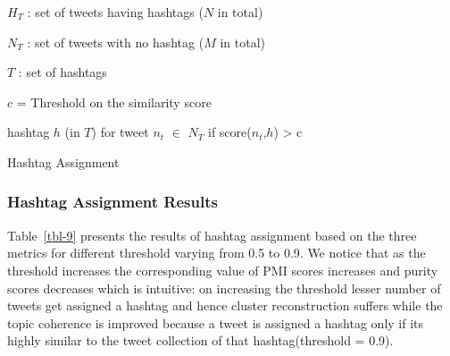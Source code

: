 \documentclass[10pt,a5paper,twoside]{article}
\newcommand{\var}{v}
\begin{document}

\incmargin{1.5em}
\linesnumbered
\begin{algorithm}[hb!]
\dontprintsemicolon

\Input
{
$H_T$ : set of tweets having hashtags ($N$ in total)
 
$N_T$ : set of tweets with no hashtag ($M$ in total)
 
$T$ : set of hashtags
 
$c$ = \footnotesize{Threshold} on the similarity score
}
\Output
{
hashtag $h$ (in $T$) for tweet $n_t$ $\in$ $N_T$ if score($n_t$,$h$) > c
}
\BlankLine
{\small
{}
}
\caption{{\sc Hashtag Assignment} \label{alg-1}}
\end{algorithm}
\decmargin{1.5em}


\subsubsection{Hashtag Assignment Results}

Table~\ref{tbl-9} presents the results of hashtag assignment based on
the three metrics for different threshold varying from 0.5 to 0.9. We
notice that as the threshold increases the corresponding value of PMI
scores increases and purity scores decreases which is intuitive: on
increasing the threshold lesser number of tweets get assigned a
hashtag and hence cluster reconstruction suffers while the topic
coherence is improved because a tweet is assigned a hashtag only if
its highly similar to the tweet collection of that hashtag(threshold =
0.9).
\end{document}
